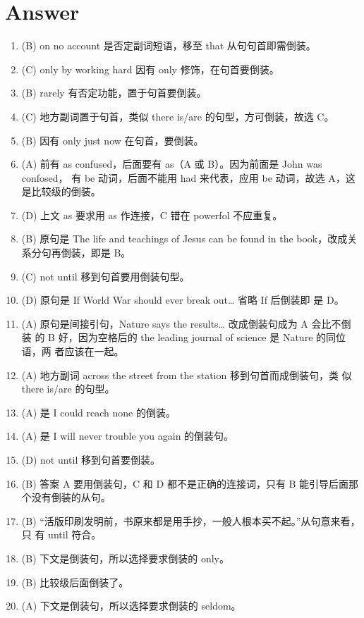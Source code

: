 \section{Answer}
\begin{enumerate}
\item (B) on no account 是否定副词短语，移至 that 从句句首即需倒装。

\item (C) only by working hard 因有 only 修饰，在句首要倒装。

\item (B) rarely 有否定功能，置于句首要倒装。

\item (C) 地方副词置于句首，类似 there is/are 的句型，方可倒装，故选 C。

\item (B) 因有 only just now 在句首，要倒装。

\item (A) 前有 as confused，后面要有 as（A 或 B）。因为前面是 John was confosed，
  有 be 动词，后面不能用 had 来代表，应用 be 动词，故选 A，这是比较级的倒装。

\item (D) 上文 as 要求用 as 作连接，C 错在 powerfol 不应重复。

\item (B) 原句是 The life and teachings of Jesus can be found in the book，改成关系分句再倒装，即是 B。


\item (C) not until 移到句首要用倒装句型。
\item (D) 原句是 If World War  should ever break out… 省略 If 后倒装即
  是 D。

\item (A) 原句是间接引句，Nature says the results… 改成倒装句成为 A 会比不倒装
  的 B 好，因为空格后的 the leading journal of science 是 Nature 的同位语，两
  者应该在一起。

\item (A) 地方副词 across the street from the station 移到句首而成倒装句，类
  似 there is/are 的句型。

\item (A) 是 I could reach none 的倒装。

\item (A) 是 I will never trouble you again 的倒装句。

\item (D) not until 移到句首要倒装。

\item (B) 答案 A 要用倒装句，C 和 D 都不是正确的连接词，只有 B 能引导后面那个没有倒装的从句。

\item (B) “活版印刷发明前，书原来都是用手抄，一般人根本买不起。”从句意来看，只
  有 until 符合。

\item (B) 下文是倒装句，所以选择要求倒装的 only。

\item (B) 比较级后面倒装了。

\item (A) 下文是倒装句，所以选择要求倒装的 seldom。
\end{enumerate}

